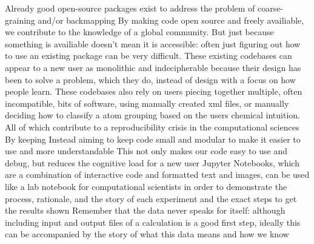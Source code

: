Already good open-source packages exist to address the problem of coarse-graining and/or backmapping \cite{Marrink2007,Ruhle2009,Maerxke2011,MorphCT,Wassenaar2014b} %
By making code open source and freely availiable, we contribute to the knowledge of a global community. 
But just because something is availiable doesn't mean it is accessible: often just figuring out how to use an existing package can be very difficult. \cite{Cummings2019}
These existing codebases can appear to a new user as monolithic and indecipherable because their design has been to solve a problem, which they do, instead of design with a focus on how people learn.
These codebases also rely on users piecing together multiple, often incompatible, bits of software, using manually created xml files, or manually deciding how to classify a atom grouping based on the users chemical intuition.
All of which contribute to a reproducibility crisis in the computational sciences\cite{Baker2016}
By keeping %
Instead aiming to keep code small and modular to make it easier to use and more understandable\cite{Adorf2018a} 
This not only makes our code easy to use and debug, but reduces the cognitive load for a new user \cite{Jankowski2019}
Jupyter Notebooks, which are a combination of interactive code and formatted text and images, can be used like a lab notebook for computational scientists in order to demonstrate the process, rationale, and the story of each experiment and the exact steps to get the results shown\cite{Rule2019a}
Remember that the data never speaks for itself: although including input and output files of a calculation is a good first step, ideally this can be accompanied by the story of what this data means and how we know \cite{https://v4.software-carpentry.org/softeng/principles.html, Wilson2016}

